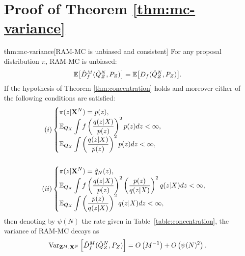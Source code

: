\section{Proof of Theorem \ref{thm:mc-variance}}\label{appendix:full-statment-proof-mc}

\begin{reptheorem}{thm:mc-variance}[RAM-MC is unbiased and consistent]
For any proposal distribution $\pi$, RAM-MC is unbiased:
%
\begin{align*}
\mathbb{E}\bigl[\hat{D}^M_f( \hat{Q}_Z^N , P_Z)\bigr] =\mathbb{E}\bigl[D_f( \hat{Q}^N_{Z} , P_Z )\bigr].
\end{align*}
%
If the hypothesis of Theorem \ref{thm:concentration} holds and moreover either of the following conditions are satisfied:
\begin{align*}
(i)& \begin{cases}
\displaystyle \pi(z|\mathbf{X}^N) = p(z), \\
\displaystyle \mathbb{E}_{Q_X} \int f\left( \frac{q(z|X)}{p(z)}\right)^2 p(z) dz  < \infty, \\
\displaystyle \mathbb{E}_{Q_X} \int \left( \frac{q(z|X)}{p(z)} \right)^2 p(z) dz < \infty,
\end{cases}\\ \ \\
(ii)& \begin{cases}
\displaystyle \pi(z | \mathbf{X}^N) = \hat{q}_N(z), \\
\displaystyle \mathbb{E}_{Q_X} \int f\left( \frac{q(z|X)}{p(z)}\right)^2 \left(\frac{p(z)}{q(z|X)}\right)^2 q(z|X) dz < \infty, \\
\displaystyle \mathbb{E}_{Q_X} \int \left(\frac{p(z)}{q(z|X)} \right)^2 q(z|X) dz < \infty,
\end{cases}
\end{align*}
then denoting by $\psi(N)$ the rate given in Table~\ref{table:concentration}, the variance of RAM-MC decays as
\begin{align*}
    \text{Var}_{\mathbf{Z}^M, \mathbf{X}^N} \left[\hat{D}^M_f( \hat{Q}_Z^N , P_Z)  \right] = 
    O\left(M^{-1}\right) + O\left( \psi(N)^2 \right).
\end{align*}
%
\end{reptheorem}

